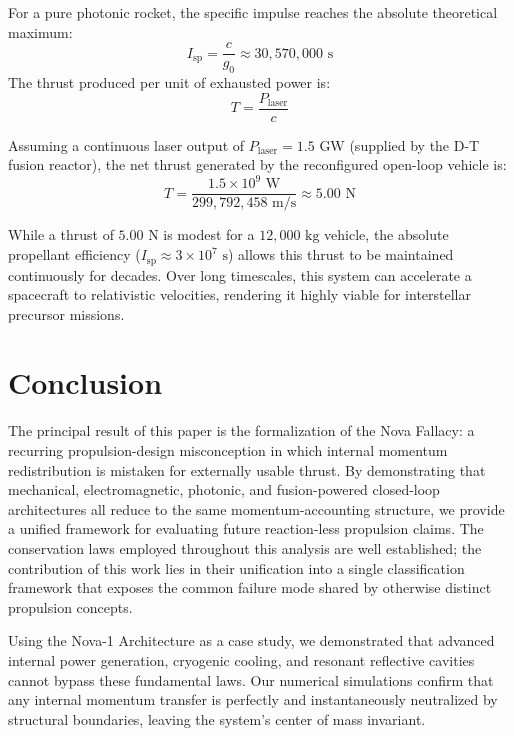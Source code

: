 \documentclass[journal,10pt,twoside]{IEEEtran}
\begin{document}
For a pure photonic rocket, the specific impulse reaches the absolute theoretical maximum:
\begin{equation}
I_{\text{sp}} = \frac{c}{g_0} \approx 30,570,000 \text{ s}
\label{eq:isp_value}
\end{equation}
The thrust produced per unit of exhausted power is:
\begin{equation}
T = \frac{P_{\text{laser}}}{c}
\label{eq:thrust_power_relation}
\end{equation}

Assuming a continuous laser output of $P_{\text{laser}} = 1.5\text{ GW}$ (supplied by the D-T fusion reactor), the net thrust generated by the reconfigured open-loop vehicle is:
\begin{equation}
T = \frac{1.5 \times 10^9 \text{ W}}{299,792,458 \text{ m/s}} \approx 5.00 \text{ N}
\label{eq:thrust_calculation}
\end{equation}

While a thrust of $5.00\text{ N}$ is modest for a $12,000\text{ kg}$ vehicle, the absolute propellant efficiency ($I_{\text{sp}} \approx 3 \times 10^7\text{ s}$) allows this thrust to be maintained continuously for decades. Over long timescales, this system can accelerate a spacecraft to relativistic velocities, rendering it highly viable for interstellar precursor missions.

\section{Conclusion}
\label{sec:conclusion}
The principal result of this paper is the formalization of the Nova Fallacy: a recurring propulsion-design misconception in which internal momentum redistribution is mistaken for externally usable thrust. By demonstrating that mechanical, electromagnetic, photonic, and fusion-powered closed-loop architectures all reduce to the same momentum-accounting structure, we provide a unified framework for evaluating future reaction-less propulsion claims. The conservation laws employed throughout this analysis are well established; the contribution of this work lies in their unification into a single classification framework that exposes the common failure mode shared by otherwise distinct propulsion concepts.

Using the Nova-1 Architecture as a case study, we demonstrated that advanced internal power generation, cryogenic cooling, and resonant reflective cavities cannot bypass these fundamental laws. Our numerical simulations confirm that any internal momentum transfer is perfectly and instantaneously neutralized by structural boundaries, leaving the system's center of mass invariant.
\end{document}
